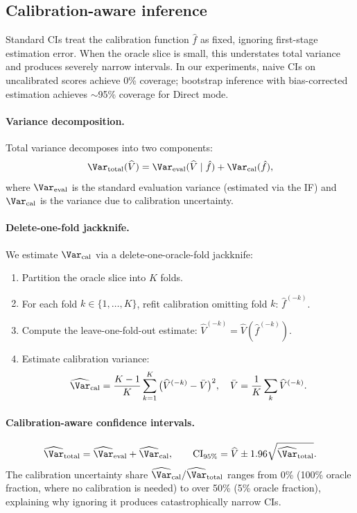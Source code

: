 \subsection{Calibration-aware inference}
\label{ssec:method-oua}

Standard CIs treat the calibration function $\hat f$ as fixed, ignoring first-stage estimation error. When the oracle slice is small, this understates total variance and produces severely narrow intervals. In our experiments, naive CIs on uncalibrated scores achieve 0\% coverage; bootstrap inference with bias-corrected estimation achieves ${\sim}$95\% coverage for Direct mode.

\paragraph{Variance decomposition.}
Total variance decomposes into two components:
\[
\Var_{\text{total}}(\widehat V) = \Var_{\text{eval}}(\widehat V \mid \hat f) + \Var_{\text{cal}}(\hat f),
\]
where $\Var_{\text{eval}}$ is the standard evaluation variance (estimated via the IF) and $\Var_{\text{cal}}$ is the variance due to calibration uncertainty.

\paragraph{Delete-one-fold jackknife.}
We estimate $\Var_{\text{cal}}$ via a delete-one-oracle-fold jackknife:
\begin{enumerate}[leftmargin=*,itemsep=2pt,topsep=2pt]
\item Partition the oracle slice into $K$ folds.
\item For each fold $k \in \{1,\ldots,K\}$, refit calibration omitting fold $k$: $\hat f^{(-k)}$.
\item Compute the leave-one-fold-out estimate: $\widehat V^{(-k)} = \widehat V(\hat f^{(-k)})$.
\item Estimate calibration variance:
\[
\widehat{\Var}_{\text{cal}} = \frac{K-1}{K} \sum_{k=1}^K \big(\widehat V^{(-k)} - \bar V\big)^2, \quad \bar V = \frac{1}{K}\sum_k \widehat V^{(-k)}.
\]
\end{enumerate}

\paragraph{Calibration-aware confidence intervals.}
\[
\widehat{\Var}_{\text{total}} = \widehat{\Var}_{\text{eval}} + \widehat{\Var}_{\text{cal}}, \qquad
\text{CI}_{95\%} = \widehat V \pm 1.96 \sqrt{\widehat{\Var}_{\text{total}}}.
\]
The calibration uncertainty share $\widehat{\Var}_{\text{cal}} / \widehat{\Var}_{\text{total}}$ ranges from 0\% (100\% oracle fraction, where no calibration is needed) to over 50\% (5\% oracle fraction), explaining why ignoring it produces catastrophically narrow CIs.

